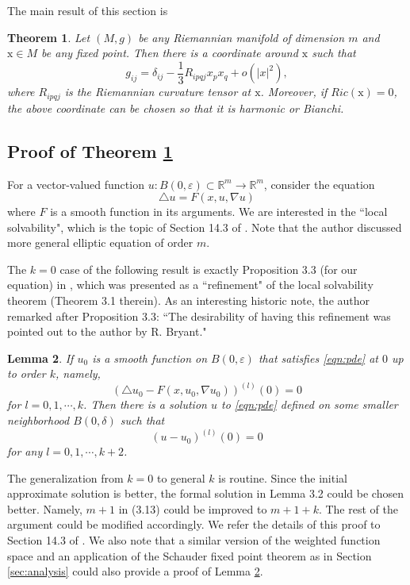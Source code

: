 \documentclass{amsart}
\newtheorem{thm}{Theorem}[section]
\newtheorem{lem}[thm]{Lemma}
\newcommand{\abs}[1]{\left\vert#1\right\vert}
\newcommand{\Real}{\mathbb R}
\newcommand{\bx}{\mathrm{x}}
\numberwithin{equation}{section}
\begin{document}
The main result of this section is
\begin{thm}\label{thm:known}
	Let $(M,g)$ be any Riemannian manifold of dimension $m$ and $\bx \in M$ be any fixed point. Then there is a coordinate around $\bx$ such that
	\[
		g_{ij}= \delta_{ij}- \frac{1}{3}R_{ipqj}x_p x_q + o(\abs{x}^2),
	\]
	where $R_{ipqj}$ is the Riemannian curvature tensor at $\bx$.
	Moreover, if $Ric(\bx)=0$, the above coordinate can be chosen so that it is harmonic or Bianchi.
\end{thm}


\subsection{Proof of Theorem \ref{thm:known}}


For a vector-valued function $u: B(0,\varepsilon)\subset \Real^m\to \Real^m$, consider the equation
\begin{equation}
	\label{eqn:pde}
	\triangle u = F(x,u,\nabla u)
\end{equation}
where $F$ is a smooth function in its arguments.  We are interested in the ``local solvability", which is the topic of Section 14.3 of \cite{taylorbook}. Note that the author discussed more general elliptic equation of order $m$.

The $k=0$ case of the following result is exactly Proposition 3.3 (for our equation) in \cite{taylorbook}, which was presented as a ``refinement" of the local solvability theorem (Theorem 3.1 therein). As an interesting historic note, the author remarked after Proposition 3.3: ``The desirability of having this refinement was pointed out to the author by R. Bryant."
\begin{lem}
	\label{lem:pde} If $u_0$ is a smooth function on $B(0,\varepsilon)$ that satisfies \eqref{eqn:pde} at $0$ up to order $k$, namely,
	\[
		\left( \triangle u_0 - F(x,u_0,\nabla u_0) \right)^{(l)}(0)=0
	\]
	for $l=0,1,\cdots ,k$. Then there is a solution $u$ to \eqref{eqn:pde} defined on some smaller neighborhood $B(0,\delta)$ such that
	\[
		(u-u_0)^{(l)}(0)=0
	\]
	for any $l=0,1,\cdots ,k+2$.
\end{lem}
The generalization from $k=0$ to general $k$ is routine. Since the initial approximate solution is better, the formal solution in Lemma 3.2 could be chosen better. Namely, $m+1$ in (3.13) could be improved to $m+1+k$. The rest of the argument could be modified accordingly. We refer the details of this proof to Section 14.3 of \cite{taylorbook}. We also note that a similar version of the weighted function space and an application of the Schauder fixed point theorem as in Section \ref{sec:analysis} could also provide a proof of Lemma \ref{lem:pde}.
\end{document}
